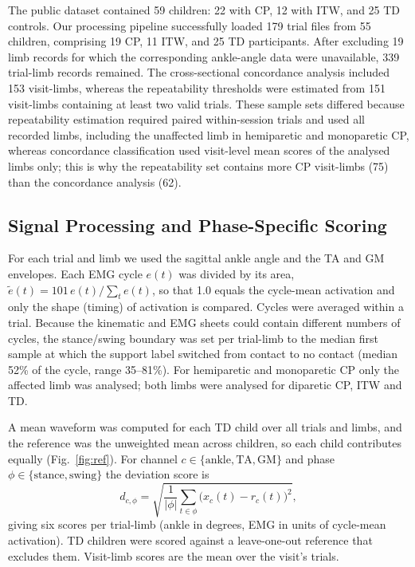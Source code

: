 \documentclass[conference]{IEEEtran}
\begin{document}
The public dataset contained 59 children: 22 with CP, 12 with ITW, and 25 TD controls. Our processing pipeline successfully loaded 179 trial files from 55 children, comprising 19 CP, 11 ITW, and 25 TD participants. After excluding 19 limb records for which the corresponding ankle-angle data were unavailable, 339 trial-limb records remained. The cross-sectional concordance analysis included 153 visit-limbs, whereas the repeatability thresholds were estimated from 151 visit-limbs containing at least two valid trials. These sample sets differed because repeatability estimation required paired within-session trials and used all recorded limbs, including the unaffected limb in hemiparetic and monoparetic CP, whereas concordance classification used visit-level mean scores of the analysed limbs only; this is why the repeatability set contains more CP visit-limbs (75) than the concordance analysis (62).

\subsection{Signal Processing and Phase-Specific Scoring}
For each trial and limb we used the sagittal ankle angle and the TA and GM envelopes. Each EMG cycle $e(t)$ was divided by its area, $\tilde e(t)=101\,e(t)/\sum_t e(t)$, so that 1.0 equals the cycle-mean activation and only the shape (timing) of activation is compared. Cycles were averaged within a trial. Because the kinematic and EMG sheets could contain different numbers of cycles, the stance/swing boundary was set per trial-limb to the median first sample at which the support label switched from contact to no contact (median 52\% of the cycle, range 35--81\%). For hemiparetic and monoparetic CP only the affected limb was analysed; both limbs were analysed for diparetic CP, ITW and TD.


A mean waveform was computed for each TD child over all trials and limbs, and the reference was the unweighted mean across children, so each child contributes equally (Fig.~\ref{fig:ref}). For channel $c\in\{\text{ankle},\text{TA},\text{GM}\}$ and phase $\phi\in\{\text{stance},\text{swing}\}$ the deviation score is
\begin{equation}
d_{c,\phi}=\sqrt{\frac{1}{|\phi|}\sum_{t\in\phi}\big(x_c(t)-r_c(t)\big)^2},
\end{equation}
giving six scores per trial-limb (ankle in degrees, EMG in units of cycle-mean activation). TD children were scored against a leave-one-out reference that excludes them. Visit-limb scores are the mean over the visit's trials.
\end{document}
